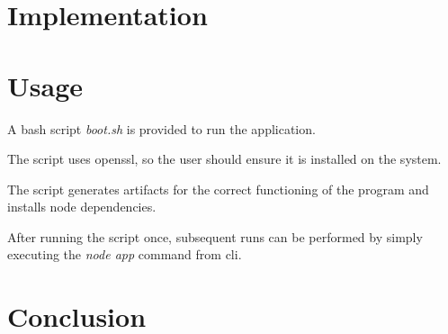 \documentclass[12pt, a4paper]{report}
\begin{document}
\chapter{Implementation}
\chapter{Usage}
A bash script \emph{boot.sh} is provided to run the application.

The script uses openssl, so the user should ensure it is installed on the system.

The script generates artifacts for the correct functioning of the program and installs node dependencies.

After running the script once, subsequent runs can be performed by simply executing the \emph{node app} command from cli.

\chapter{Conclusion}



\end{document}
